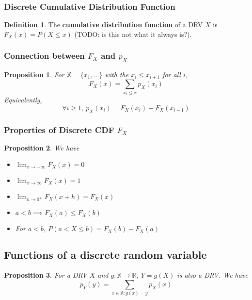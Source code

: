 \documentclass[12pt]{article}
\newtheorem*{prop*}{Proposition}
\theoremstyle{definition}
\newtheorem*{defn*}{Definition}
\newcommand{\R}{\mathbb{R}}
\newcommand{\X}{\mathbb{X}}
\begin{document}
\subsubsection{Discrete Cumulative Distribution Function}

\begin{defn*}
  The \textbf{cumulative distribution function} of a DRV $X$ is $F_X(x) = P(X \leq x)$ (TODO: is this not what it always is?).
\end{defn*}

\subsubsection{Connection between $F_X$ and $p_X$}

\begin{prop*}
  For $\X = \{x_1, \ldots\}$ with the $x_i \leq x_{i + 1}$ for all $i$,
  $$F_X(x) = \sum_{x_i \leq x}p_X(x_i)$$
  Equivalently,
  $$\forall i \geq 1,\ p_X(x_i) = F_X(x_i) - F_X(x_{i - 1})$$
\end{prop*}

\subsubsection{Properties of Discrete CDF $F_X$}

\begin{prop*}
  We have
  \begin{itemize}
    \item $\lim_{x \to -\infty}F_X(x) = 0$
    \item $\lim_{x \to \infty}F_X(x) = 1$
    \item $\lim_{h \to 0^+}F_X(x + h) = F_X(x)$
    \item $a < b \implies F_X(a) \leq F_X(b)$
    \item For $a < b$, $P(a < X \leq b) = F_X(b) - F_X(a)$
  \end{itemize}
\end{prop*}

\subsection{Functions of a discrete random variable}

\begin{prop*}
  For a DRV $X$ and $g : \X \to \R$, $Y = g(X)$ is also a DRV.
  We have
  $$p_Y(y) = \sum_{x \in \X : g(x) = y}p_X(x)$$
\end{prop*}
\end{document}
